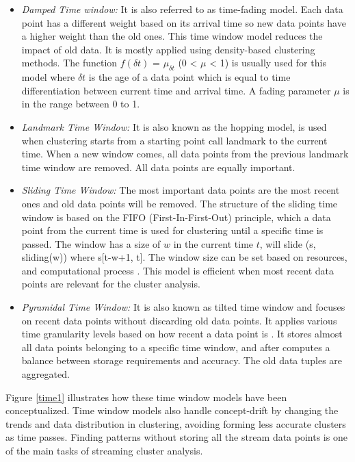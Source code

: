 \begin{itemize}

    \item\textit{Damped Time window:} It is also referred to as time-fading model. Each data point has a different weight based on its arrival time so new data points have a higher weight than the old ones. This time window model reduces the impact of old data. It is mostly applied using density-based clustering methods. The function $f(\delta t)$ = $\mu_{\delta t}$ (0 < $\mu$ < 1) is usually used for this model where $\delta t$ is the age of a data point which is equal to time differentiation between current time and arrival time. A fading parameter $\mu$ is in the range between 0 to 1. 
    
    
    \item\textit{Landmark Time Window:} It is also known as the hopping model, is used when clustering starts from a starting point call landmark to the current time. When a new window comes, all data points from the previous landmark time window are removed. All data points are equally important.

    \item\textit{Sliding Time Window: } The most important data points are the most recent ones and old data points will be removed. The structure of the sliding time window is based on the FIFO (First-In-First-Out) principle, which a data point from the current time is used for clustering until a specific time is passed. The window has a size of $w$ in the current time $t$, will slide (s, sliding(w)) where s[t-w+1, t].
    The window size can be set based on resources, and computational process \cite{silva2013data}. This model is efficient when most recent data points are relevant for the cluster analysis.  
    
    \item\textit{Pyramidal Time Window: } It is also known as tilted time window and focuses on recent data points without discarding old data points. It applies various time granularity levels based on how recent a data point is \cite{aggarwal2003framework, nguyen2015survey}. It stores almost all data points belonging to a specific time window, and after computes a balance between storage requirements and accuracy. The old data tuples are aggregated. %
    
\end{itemize}    

Figure   \ref{time1} illustrates how these time window models have been conceptualized. Time window models also handle concept-drift by changing the trends and data distribution in clustering, avoiding forming less accurate clusters as time passes. Finding patterns without storing all the stream data points is one of the main tasks of streaming cluster analysis.


